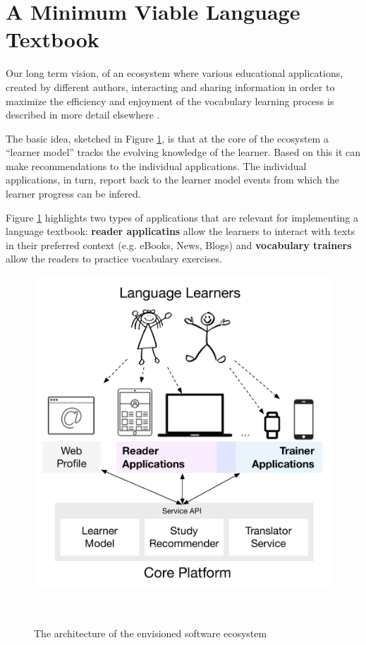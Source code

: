 
\newpage
\section{A Minimum Viable Language Textbook}
\label{sec:system}

Our long term vision, of an ecosystem where various educational applications, created by different authors, interacting and sharing information in order to maximize the efficiency and enjoyment of the vocabulary learning process is described in more detail elsewhere \cite{Lungu16}. 

The basic idea, sketched in Figure \ref{fig:architecture}, is that at the core of the ecosystem a ``learner model'' tracks the evolving knowledge of the learner. Based on this it can make recommendations to the individual applications. The individual applications, in turn, report back to the learner model events from which the learner progress can be infered. 

Figure \ref{fig:architecture} highlights two types of applications that are relevant for implementing a language textbook: {\bf reader applicatins} allow the learners to interact with texts in their preferred context (e.g. eBooks, News, Blogs) and {\bf vocabulary trainers} allow the readers to practice vocabulary exercises. 

\begin{figure}[h!]
\centering
  \includegraphics[width=0.8\columnwidth]{figures/zeeguu-architecture.pdf}
  \caption{The architecture of the envisioned software ecosystem}~\label{fig:architecture}
\end{figure}



